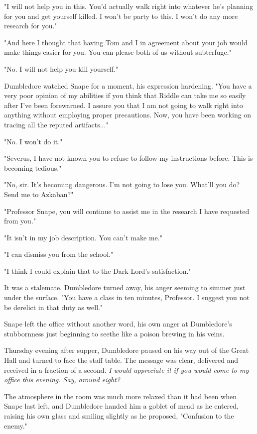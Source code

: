 \documentclass[a4paper,11pt]{article}
\begin{document}
"I will not help you in this. You'd actually walk right into whatever he's planning for you and get yourself killed. I won't be party to this. I won't do any more research for you."

"And here I thought that having Tom and I in agreement about your job would make things easier for you. You can please both of us without subterfuge."

"No. I will not help you kill yourself."

Dumbledore watched Snape for a moment, his expression hardening. "You have a very poor opinion of my abilities if you think that Riddle can take me so easily after I've been forewarned. I assure you that I am not going to walk right into anything without employing proper precautions. Now, you have been working on tracing all the reputed artifacts..."

"No. I won't do it."

"Severus, I have not known you to refuse to follow my instructions before. This is becoming tedious."

"No, sir. It's becoming dangerous. I'm not going to lose you. What'll you do? Send me to Azkaban?"

"Professor Snape, you will continue to assist me in the research I have requested from you."

"It isn't in my job description. You can't make me."

"I can dismiss you from the school."

"I think I could explain that to the Dark Lord's satisfaction."

It was a stalemate. Dumbledore turned away, his anger seeming to simmer just under the surface. "You have a class in ten minutes, Professor. I suggest you not be derelict in that duty as well."

Snape left the office without another word, his own anger at Dumbledore's stubbornness just beginning to seethe like a poison brewing in his veins.

Thursday evening after supper, Dumbledore paused on his way out of the Great Hall and turned to face the staff table. The message was clear, delivered and received in a fraction of a second. \emph{I would appreciate it if you would come to my office this evening. Say, around eight?}

The atmosphere in the room was much more relaxed than it had been when Snape last left, and Dumbledore handed him a goblet of mead as he entered, raising his own glass and smiling slightly as he proposed, "Confusion to the enemy."
\end{document}
